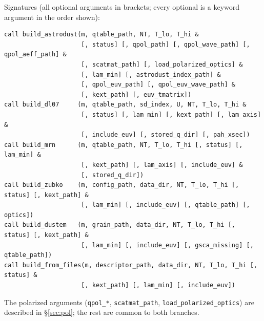 \documentclass{my_memo}
\newcommand{\code}[1]{\texttt{#1}}
\begin{document}
\noindent Signatures (all optional arguments in brackets; every optional is a
keyword argument in the order shown):
\begin{lstlisting}
call build_astrodust(m, qtable_path, NT, T_lo, T_hi &
                     [, status] [, qpol_path] [, qpol_wave_path] [, qpol_aeff_path] &
                     [, scatmat_path] [, load_polarized_optics] &
                     [, lam_min] [, astrodust_index_path] &
                     [, qpol_euv_path] [, qpol_euv_wave_path] &
                     [, kext_path] [, euv_tmatrix])
call build_dl07     (m, qtable_path, sd_index, U, NT, T_lo, T_hi &
                     [, status] [, lam_min] [, kext_path] [, lam_axis] &
                     [, include_euv] [, stored_q_dir] [, pah_xsec])
call build_mrn      (m, qtable_path, NT, T_lo, T_hi [, status] [, lam_min] &
                     [, kext_path] [, lam_axis] [, include_euv] &
                     [, stored_q_dir])
call build_zubko    (m, config_path, data_dir, NT, T_lo, T_hi [, status] [, kext_path] &
                     [, lam_min] [, include_euv] [, qtable_path] [, optics])
call build_dustem   (m, grain_path, data_dir, NT, T_lo, T_hi [, status] [, kext_path] &
                     [, lam_min] [, include_euv] [, gsca_missing] [, qtable_path])
call build_from_files(m, descriptor_path, data_dir, NT, T_lo, T_hi [, status] &
                     [, kext_path] [, lam_min] [, include_euv])
\end{lstlisting}

\noindent The polarized arguments (\code{qpol\_*}, \code{scatmat\_path},
\code{load\_polarized\_optics}) are described in \S\ref{sec:pol}; the rest are
common to both branches.
\end{document}
